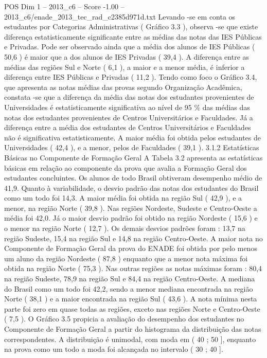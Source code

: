 \begin{textsample}{POS Dim 1 – 2013\_c6 – Score -1.00 – 2013\_c6/enade\_2013\_tec\_rad\_c2385d971d.txt}
Levando -se em conta os estudantes por Categorias Administrativas ( Gráfico 3.3 ), observa -se que existe diferença estatisticamente significante entre as médias das notas das IES Públicas e Privadas.
Pode ser observado ainda que a média dos alunos de IES Públicas ( 50,6 ) é maior que a dos alunos de IES Privadas ( 39,4 ).
A diferença entre as médias das regiões Sul e Norte ( 6,1 ), a maior e a menor média, é inferior a diferença entre IES Públicas e Privadas ( 11,2 ).
Tendo como foco o Gráfico 3.4, que apresenta as notas médias das provas segundo Organização Acadêmica, constata -se que a diferença da média das notas dos estudantes provenientes de Universidades é estatisticamente significativa ao nível de 95 \% das médias das notas dos estudantes provenientes de Centros Universitários e Faculdades.
Já a diferença entre a média dos estudantes de Centros Universitários e Faculdades não é significativa estatisticamente.
A maior média foi obtida pelos estudantes de Universidades ( 42,4 ), e a menor, pelos de Faculdades ( 39,1 ). 3.1.2 Estatísticas Básicas no Componente de Formação Geral A Tabela 3.2 apresenta as estatísticas básicas em relação ao componente da prova que avalia a Formação Geral dos estudantes concluintes.
Os alunos de todo Brasil obtiveram desempenho médio de 41,9.
Quanto à variabilidade, o desvio padrão das notas dos estudantes do Brasil como um todo foi 14,3.
A maior média foi obtida na região Sul ( 42,9 ), e a menor, na região Norte ( 39,8 ).
Nas regiões Nordeste, Sudeste e Centro-Oeste a média foi 42,0.
Já o maior desvio padrão foi obtido na região Nordeste ( 15,6 ) e o menor na região Norte ( 12,7 ).
Os demais desvios padrões foram : 13,7 na região Sudeste, 15,4 na região Sul e 14,8 na região Centro-Oeste.
A maior nota no Componente de Formação Geral da prova do ENADE foi obtida por pelo menos um aluno da região Nordeste ( 87,8 ) enquanto que a menor nota máxima foi obtida na região Norte ( 75,3 ).
Nas outras regiões as notas máximas foram : 80,4 na região Sudeste, 78,9 na região Sul e 84,4 na região Centro-Oeste.
A mediana do Brasil como um todo foi 42,2, sendo a menor mediana encontrada na região Norte ( 38,1 ) e a maior encontrada na região Sul ( 43,6 ).
A nota mínima nesta parte foi zero em quase todas as regiões, exceto nas regiões Norte e Centro-Oeste ( 7,5 ).
O Gráfico 3.5 propicia a avaliação do desempenho dos estudantes no Componente de Formação Geral a partir do histograma da distribuição das notas correspondentes.
A distribuição é unimodal, com moda em ( 40 ; 50 ], enquanto na prova como um todo a moda foi alcançada no intervalo ( 30 ; 40 ].

\end{textsample}
